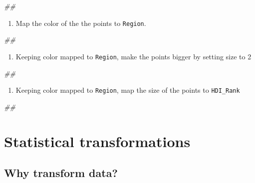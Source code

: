 \documentclass[]{book}
\newenvironment{Shaded}{\begin{snugshade}}{\end{snugshade}}
\newcommand{\CommentTok}[1]{\textcolor[rgb]{0.56,0.35,0.01}{\textit{#1}}}
\providecommand{\tightlist}{%
  \setlength{\itemsep}{0pt}\setlength{\parskip}{0pt}}
\begin{document}
\begin{Shaded}
\begin{Highlighting}[]
\CommentTok{## }
\end{Highlighting}
\end{Shaded}

\begin{enumerate}
\def\labelenumi{\arabic{enumi}.}
\setcounter{enumi}{2}
\tightlist
\item
  Map the color of the the points to \texttt{Region}.
\end{enumerate}

\begin{Shaded}
\begin{Highlighting}[]
\CommentTok{## }
\end{Highlighting}
\end{Shaded}

\begin{enumerate}
\def\labelenumi{\arabic{enumi}.}
\setcounter{enumi}{3}
\tightlist
\item
  Keeping color mapped to \texttt{Region}, make the points bigger by setting size to 2
\end{enumerate}

\begin{Shaded}
\begin{Highlighting}[]
\CommentTok{## }
\end{Highlighting}
\end{Shaded}

\begin{enumerate}
\def\labelenumi{\arabic{enumi}.}
\setcounter{enumi}{4}
\tightlist
\item
  Keeping color mapped to \texttt{Region}, map the size of the points to \texttt{HDI\_Rank}
\end{enumerate}

\begin{Shaded}
\begin{Highlighting}[]
\CommentTok{## }
\end{Highlighting}
\end{Shaded}

\hypertarget{statistical-transformations}{%
\section{Statistical transformations}\label{statistical-transformations}}

\hypertarget{why-transform-data}{%
\subsection{Why transform data?}\label{why-transform-data}}
\end{document}

